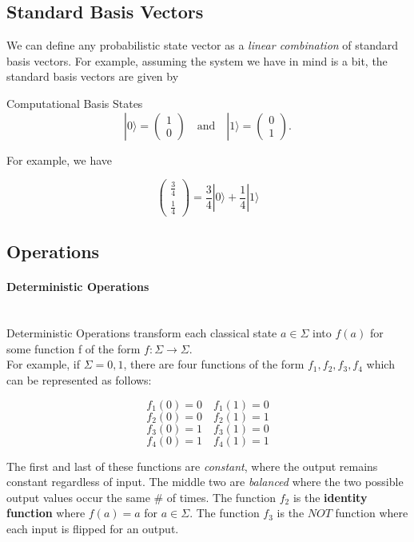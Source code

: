 \documentclass[svgnames]{article}     %
\begin{document}
\subsection{Standard Basis Vectors}

We can define any probabilistic state vector as a \textit{linear combination} of standard basis vectors. For example, assuming the system we have in mind is a bit, the standard basis vectors are given by 

\begin{subbox}{Computational Basis States}
  \[
  |0\rangle = \begin{pmatrix}
    1 \\ 0  
  \end{pmatrix} \quad \text{and} \quad |1 \rangle = \begin{pmatrix}
    0 \\ 1
  \end{pmatrix}.
\]
\end{subbox}

For example, we have

\[
\begin{pmatrix}
  \frac{3}{4}\\[5px] \frac{1}{4} 
\end{pmatrix} = \frac{3}{4} |0\rangle + \frac{1}{4}|1\rangle
\] \vspace{5px}
\subsection{Operations}

\paragraph{Deterministic Operations} \mbox{} \\

Deterministic Operations transform each classical state $a \in \Sigma$ into $f(a)$ for some function f of the form $f: \Sigma \rightarrow \Sigma$. \\

For example, if  $\Sigma = {0,1}$, there are four functions of the form $f_1, f_2, f_3, f_4$ which can be represented as follows: 

\[
f_1(0) = 0 \quad f_1(1) = 0 
\] 
\[ f_2(0) = 0 \quad f_2(1) = 1 \]
\[f_3(0) = 1 \quad f_3(1) = 0 \]
\[ f_4(0) = 1 \quad f_4(1) = 1 \] \vspace{5px}

The first and last of these functions are  \textit{constant}, where the output remains constant regardless of input. The middle two are \textit{balanced} where the two possible output values occur the same \# of times. The function $f_2$ is the \textbf{identity function} where $f(a) = a$ for $a \in \Sigma$. The function $f_3$ is the  $NOT$ function where each input is flipped for an output. \\
\end{document}
